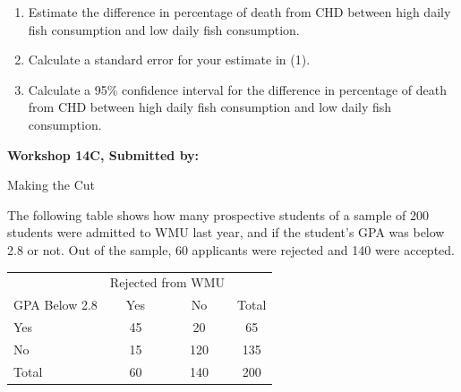 \documentclass[11pt, chapterprefix=true]{scrbook}\usepackage[]{graphicx}\usepackage[]{color}
\begin{document}
\begin{exercises}
\begin{exercise}
\begin{enumerate}
  \item Estimate the difference in percentage of death from CHD between high daily fish consumption and low daily fish consumption.
  \item Calculate a standard error for your estimate in (1).
  \item Calculate a 95\% confidence interval for the difference in percentage of death from CHD between high daily fish consumption and low daily fish consumption.
\end{enumerate}
			
			
\end{exercise} 
\begin{solution}  %

\end{solution}

\clearpage

    \begin{exercise}  %

    \begin{center}
\begin{flushleft}\textbf{\large \hfill Workshop 14C, Submitted by: }\end{flushleft}

\end{center}

Making the Cut

The following table shows how many prospective students of a sample of 200 students were admitted to WMU last year, and if the student's GPA was below 2.8 or not.  Out of the sample, 60 applicants were rejected and 140 were accepted. 
			
\begin{center}				
\begin{tabular}{@{} lccc @{}} \hline				
 	& \multicolumn{2}{c}{Rejected from WMU} \\   		 
GPA Below 2.8 &	Yes &	No & Total \\ \hline
Yes	& 45 &	20 &	65 \\
No &	15 &	120 &	135 \\ \hline
Total &	60 &	140 &	200 \\ \hline
\end{tabular}
\end{center} 


\end{exercise}
\end{exercises}
\end{document}
